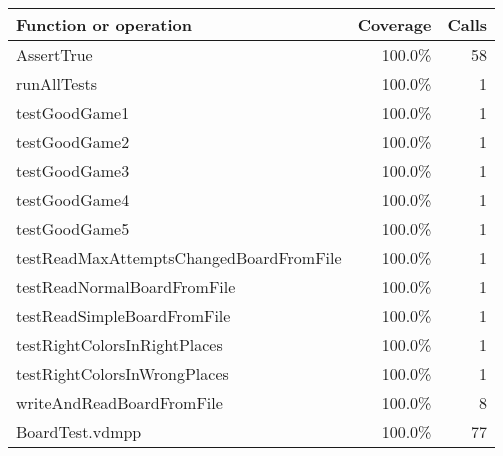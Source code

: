 \bigskip
\begin{longtable}{|l|r|r|}
\hline
Function or operation & Coverage & Calls \\
\hline
\hline
AssertTrue & 100.0\% & 58 \\
\hline
runAllTests & 100.0\% & 1 \\
\hline
testGoodGame1 & 100.0\% & 1 \\
\hline
testGoodGame2 & 100.0\% & 1 \\
\hline
testGoodGame3 & 100.0\% & 1 \\
\hline
testGoodGame4 & 100.0\% & 1 \\
\hline
testGoodGame5 & 100.0\% & 1 \\
\hline
testReadMaxAttemptsChangedBoardFromFile & 100.0\% & 1 \\
\hline
testReadNormalBoardFromFile & 100.0\% & 1 \\
\hline
testReadSimpleBoardFromFile & 100.0\% & 1 \\
\hline
testRightColorsInRightPlaces & 100.0\% & 1 \\
\hline
testRightColorsInWrongPlaces & 100.0\% & 1 \\
\hline
writeAndReadBoardFromFile & 100.0\% & 8 \\
\hline
\hline
BoardTest.vdmpp & 100.0\% & 77 \\
\hline
\end{longtable}

